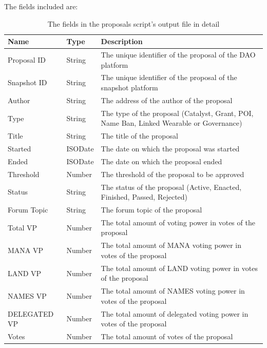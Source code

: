 \documentclass[MSE,Master,english]{twbook}%
\begin{document}
The fields included are:
\begin{table}[H]
  \centering
  \begin{tabularx}{\textwidth}{|l|l|X|}
  \hline
  \textbf{Name} & \textbf{Type} & \textbf{Description}                                            \\ \hline
  Proposal ID   & String        & The unique identifier of the proposal of the DAO platform       \\ \hline
  Snapshot ID  & String & The unique identifier of the proposal of the snapshot platform                           \\ \hline
  Author        & String        & The address of the author of the proposal                       \\ \hline
  Type         & String & The type of the proposal (Catalyst, Grant, POI, Name Ban, Linked Wearable or Governance) \\ \hline
  Title         & String        & The title of the proposal                                       \\ \hline
  Started       & ISODate       & The date on which the proposal was started                      \\ \hline
  Ended         & ISODate       & The date on which the proposal ended                            \\ \hline
  Threshold     & Number        & The threshold of the proposal to be approved                    \\ \hline
  Status       & String & The status of the proposal (Active, Enacted, Finished, Passed, Rejected)                 \\ \hline
  Forum Topic   & String        & The forum topic of the proposal                                 \\ \hline
  Total VP      & Number        & The total amount of voting power in votes of the proposal       \\ \hline
  MANA VP       & Number        & The total amount of MANA voting power in votes of the proposal  \\ \hline
  LAND VP       & Number        & The total amount of LAND voting power in votes of the proposal  \\ \hline
  NAMES VP      & Number        & The total amount of NAMES voting power in votes of the proposal \\ \hline
  DELEGATED VP & Number & The total amount of delegated voting power in votes of the proposal                      \\ \hline
  Votes         & Number        & The total amount of votes of the proposal                       \\ \hline
  \end{tabularx}
  \caption{The fields in the proposals script's output file in detail}
  \label{table:proposals}
\end{table}
\end{document}
